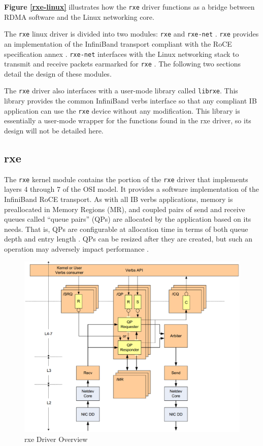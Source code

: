 \documentclass[11pt]{book}
\begin{document}
\textbf{Figure \ref{rxe-linux}} illustrates how the \verb;rxe; driver functions
as a bridge between RDMA software and the Linux networking core.

The \verb;rxe; linux driver is divided into two modules: \verb;rxe; and
\verb;rxe-net; \cite{pearson-10}. \verb;rxe; provides an implementation of the
InfiniBand transport compliant with the RoCE specification annex
\cite{InfiniBandTARoCE-10}. \verb;rxe-net; interfaces with the Linux networking
stack to transmit and receive packets earmarked for \verb;rxe;
\cite{pearson-10}. The following two sections detail the design of these
modules.

The \verb;rxe; driver also interfaces with a user-mode library called
\verb;librxe;. This library provides the common InfiniBand verbs
interface so that any compliant IB application can use the \verb;rxe; device
without any modification. This library is essentially a user-mode wrapper for
 the functions found in the rxe driver, so its design will not be detailed here.

\subsection{\textbf{rxe}}
\label{rxe}

The \verb;rxe; kernel module contains the portion of the \verb;rxe; driver that
implements layers 4 through 7 of the OSI model. It provides a software
implementation of the InfiniBand RoCE transport. As with all IB
verbs applications, memory is preallocated in Memory Regions (MR), and coupled
pairs of send and receive queues called ``queue pairs'' (QPs) are allocated by
the application based on its needs. That is, QPs are configurable at allocation
time in terms of both queue depth and entry length
\cite{InfiniBandTARoCE-10}\cite{InfiniBandTABase-07}. QPs can be resized after
they are created, but such an operation may adversely impact performance
\cite{InfiniBandTARoCE-10}.

\begin{figure}[h]
\includegraphics[width=\textwidth]{rxe_overview}
\caption{rxe Driver Overview \protect\cite{pearson-10}}
\label{rxe-overview}
\end{figure}
\end{document}
